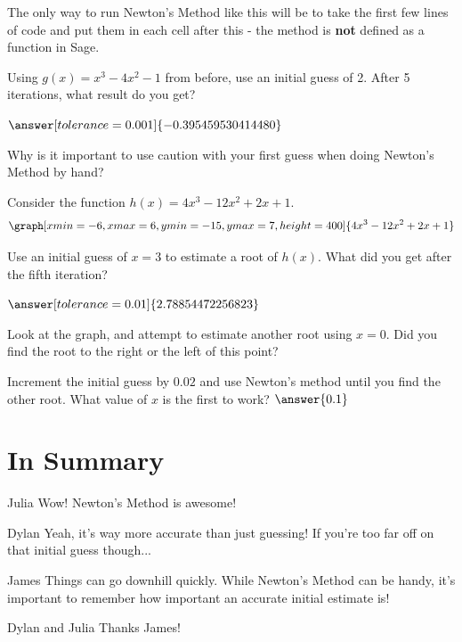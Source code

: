 \documentclass{ximera}
\begin{document}
The only way to run Newton's Method like this will be to take the first few lines of code and put them in each cell after this - the method is \textbf{not} defined as a function in Sage.

\begin{question}
Using $g(x) = x^3 -4x^2-1$ from before, use an initial guess of 2. After 5 iterations, what result do you get?

\begin{onlineOnly}
\begin{sageCell}

\end{sageCell}
\end{onlineOnly}

$\answer[tolerance=0.001]{-0.395459530414480}$

Why is it important to use caution with your first guess when doing Newton's Method by hand?
\begin{freeResponse}
\end{freeResponse}
\end{question}

\begin{question}
Consider the function $h(x) = 4x^3 - 12x^2 + 2x + 1$.
\[
\graph[xmin=-6,xmax=6,ymin=-15,ymax=7,height=400]{4x^3 - 12x^2 + 2x + 1}
\]
\begin{onlineOnly}
\begin{sageCell}

\end{sageCell}
\end{onlineOnly}


Use an initial guess of $x=3$ to estimate a root of $h(x)$. What did you get after the fifth iteration?

$\answer[tolerance=0.01]{2.78854472256823}$

Look at the graph, and attempt to estimate another root using $x = 0$. Did you find the root to the right or the left of this point?

\begin{multipleChoice}
\end{multipleChoice}

Increment the initial guess by $0.02$ and use Newton's method until you find the other root. What value of $x$ is the first to work?
$\answer{0.1}$
\end{question}

\section{In Summary}
\begin{dialogue}
\item[Julia] Wow! Newton's Method is awesome!
\item[Dylan] Yeah, it's way more accurate than just guessing! If you're too far off on that initial guess though...
\item[James] Things can go downhill quickly. While Newton's Method can be handy, it's important to remember how important an accurate initial estimate is!
\item[Dylan and Julia] Thanks James!
\end{dialogue}
\end{document}
